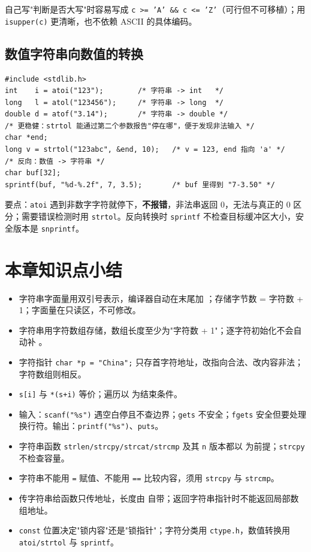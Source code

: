 自己写"判断是否大写"时容易写成 \texttt{c >= 'A' \&\& c <= 'Z'}（可行但不可移植）；用 \texttt{isupper(c)} 更清晰，也不依赖 ASCII 的具体编码。

\subsection{数值字符串向数值的转换}
\begin{lstlisting}
#include <stdlib.h>
int    i = atoi("123");        /* 字符串 -> int   */
long   l = atol("123456");     /* 字符串 -> long  */
double d = atof("3.14");       /* 字符串 -> double */
/* 更稳健：strtol 能通过第二个参数报告"停在哪"，便于发现非法输入 */
char *end;
long v = strtol("123abc", &end, 10);   /* v = 123, end 指向 'a' */
/* 反向：数值 -> 字符串 */
char buf[32];
sprintf(buf, "%d-%.2f", 7, 3.5);       /* buf 里得到 "7-3.50" */
\end{lstlisting}
要点：\texttt{atoi} 遇到非数字字符就停下，\textbf{不报错}，非法串返回 0，无法与真正的 0 区分；需要错误检测时用 \texttt{strtol}。反向转换时 \texttt{sprintf} 不检查目标缓冲区大小，安全版本是 \texttt{snprintf}。

\section{本章知识点小结}
\begin{itemize}
  \item 字符串字面量用双引号表示，编译器自动在末尾加 \nul；存储字节数 = 字符数 + 1；字面量在只读区，不可修改。
  \item 字符串用字符数组存储，数组长度至少为"字符数 + 1"；逐字符初始化不会自动补 \nul。
  \item 字符指针 \texttt{char *p = "China";} 只存首字符地址，改指向合法、改内容非法；字符数组则相反。
  \item \texttt{s[i]} 与 \texttt{*(s+i)} 等价；遍历以 \nul 为结束条件。
  \item 输入：\texttt{scanf("\%s")} 遇空白停且不查边界；\texttt{gets} 不安全；\texttt{fgets} 安全但要处理换行符。输出：\texttt{printf("\%s")}、\texttt{puts}。
  \item 字符串函数 \texttt{strlen/strcpy/strcat/strcmp} 及其 \texttt{n} 版本都以 \nul 为前提；\texttt{strcpy} 不检查容量。
  \item 字符串不能用 \texttt{=} 赋值、不能用 \texttt{==} 比较内容，须用 \texttt{strcpy} 与 \texttt{strcmp}。
  \item 传字符串给函数只传地址，长度由 \nul 自带；返回字符串指针时不能返回局部数组地址。
  \item \texttt{const} 位置决定"锁内容"还是"锁指针"；字符分类用 \texttt{ctype.h}，数值转换用 \texttt{atoi/strtol} 与 \texttt{sprintf}。
\end{itemize}

